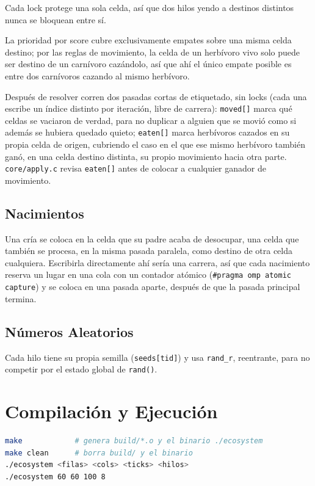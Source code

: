 \documentclass[11pt]{article}
\begin{document}
Cada lock protege una sola celda, así que dos hilos yendo a destinos
distintos nunca se bloquean entre sí.

La prioridad por score cubre exclusivamente empates sobre una misma
celda destino; por las reglas de movimiento, la celda de un herbívoro
vivo solo puede ser destino de un carnívoro cazándolo, así que ahí el
único empate posible es entre dos carnívoros cazando al mismo
herbívoro.

Después de resolver corren dos pasadas cortas de etiquetado, sin locks
(cada una escribe un índice distinto por iteración, libre de carrera):
\texttt{moved[]} marca qué celdas se vaciaron de verdad, para no
duplicar a alguien que se movió como si además se hubiera quedado
quieto; \texttt{eaten[]} marca herbívoros cazados en su propia celda de
origen, cubriendo el caso en el que ese mismo herbívoro también ganó,
en una celda destino distinta, su propio movimiento hacia otra parte.
\texttt{core/apply.c} revisa \texttt{eaten[]} antes de colocar a
cualquier ganador de movimiento.

\subsection{Nacimientos}

Una cría se coloca en la celda que su padre acaba de desocupar, una
celda que también se procesa, en la misma pasada paralela, como destino
de otra celda cualquiera. Escribirla directamente ahí sería una carrera,
así que cada nacimiento reserva un lugar en una cola con un contador
atómico (\texttt{\#pragma omp atomic capture}) y se coloca en una pasada
aparte, después de que la pasada principal termina.

\subsection{Números Aleatorios}

Cada hilo tiene su propia semilla (\texttt{seeds[tid]}) y usa
\texttt{rand\_r}, reentrante, para no competir por el estado global de
\texttt{rand()}.

\section{Compilación y Ejecución}

\begin{lstlisting}[language=bash]
make            # genera build/*.o y el binario ./ecosystem
make clean      # borra build/ y el binario
./ecosystem <filas> <cols> <ticks> <hilos>
./ecosystem 60 60 100 8
\end{lstlisting}
\end{document}
